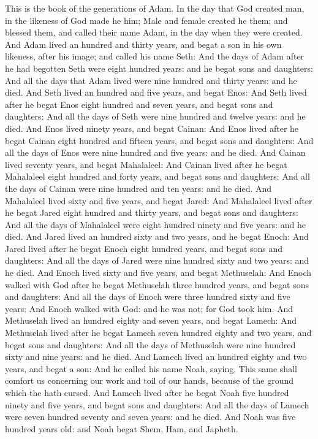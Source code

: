 \begin{biblechapter} %
 This is the book of the generations of Adam. In the day that God created man, in the likeness of God made he him;
\verse Male and female created he them; and blessed them, and called their name Adam, in the day when they were created.
\verse And Adam lived an hundred and thirty years, and begat a son in his own likeness, after his image; and called his name Seth:
\verse And the days of Adam after he had begotten Seth were eight hundred years: and he begat sons and daughters:
\verse And all the days that Adam lived were nine hundred and thirty years: and he died.
\verse And Seth lived an hundred and five years, and begat Enos:
\verse And Seth lived after he begat Enos eight hundred and seven years, and begat sons and daughters:
\verse And all the days of Seth were nine hundred and twelve years: and he died.
\verse And Enos lived ninety years, and begat Cainan:
\verse And Enos lived after he begat Cainan eight hundred and fifteen years, and begat sons and daughters:
\verse And all the days of Enos were nine hundred and five years: and he died.
\verse And Cainan lived seventy years, and begat Mahalaleel:
\verse And Cainan lived after he begat Mahalaleel eight hundred and forty years, and begat sons and daughters:
\verse And all the days of Cainan were nine hundred and ten years: and he died.
\verse And Mahalaleel lived sixty and five years, and begat Jared:
\verse And Mahalaleel lived after he begat Jared eight hundred and thirty years, and begat sons and daughters:
\verse And all the days of Mahalaleel were eight hundred ninety and five years: and he died.
\verse And Jared lived an hundred sixty and two years, and he begat Enoch:
\verse And Jared lived after he begat Enoch eight hundred years, and begat sons and daughters:
\verse And all the days of Jared were nine hundred sixty and two years: and he died.
\verse And Enoch lived sixty and five years, and begat Methuselah:
\verse And Enoch walked with God after he begat Methuselah three hundred years, and begat sons and daughters:
\verse And all the days of Enoch were three hundred sixty and five years:
\verse And Enoch walked with God: and he was not; for God took him.
\verse And Methuselah lived an hundred eighty and seven years, and begat Lamech:
\verse And Methuselah lived after he begat Lamech seven hundred eighty and two years, and begat sons and daughters:
\verse And all the days of Methuselah were nine hundred sixty and nine years: and he died.
\verse And Lamech lived an hundred eighty and two years, and begat a son:
\verse And he called his name Noah, saying, This same shall comfort us concerning our work and toil of our hands, because of the ground which the \LORD hath cursed.
\verse And Lamech lived after he begat Noah five hundred ninety and five years, and begat sons and daughters:
\verse And all the days of Lamech were seven hundred seventy and seven years: and he died.
\verse And Noah was five hundred years old: and Noah begat Shem, Ham, and Japheth.
\end{biblechapter}

